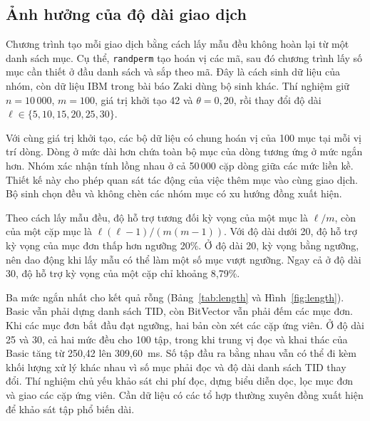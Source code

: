 \subsection{Ảnh hưởng của độ dài giao dịch}
Chương trình tạo mỗi giao dịch bằng cách lấy mẫu đều không hoàn
lại từ một danh sách mục. Cụ thể, \texttt{randperm} tạo hoán vị
các mã, sau đó chương trình lấy số mục cần thiết ở đầu danh sách
và sắp theo mã. Đây là cách sinh dữ liệu của nhóm, còn dữ liệu IBM
trong bài báo Zaki dùng bộ sinh khác. Thí nghiệm giữ $n=10\,000$,
$m=100$, giá trị khởi tạo 42 và $\theta=0{,}20$, rồi thay đổi độ dài
$\ell\in\{5,10,15,20,25,30\}$.

Với cùng giá trị khởi tạo, các bộ dữ liệu có chung hoán vị của
100 mục tại mỗi vị trí dòng. Dòng ở mức dài hơn chứa toàn bộ mục
của dòng tương ứng ở mức ngắn hơn. Nhóm xác nhận tính lồng nhau ở
cả 50\,000 cặp dòng giữa các mức liền kề. Thiết kế này cho phép
quan sát tác động của việc thêm mục vào cùng giao dịch. Bộ sinh
chọn đều và không chèn các nhóm mục có xu hướng đồng xuất hiện.

\begin{table}[tb]
\centering
\caption{Kết quả trên dữ liệu tổng hợp khi thay đổi độ dài giao dịch. Bảng dùng thời gian trung vị sau chạy khởi động và số tập phổ biến đầy đủ. Các tham số còn lại cố định theo Hình~\ref{fig:length}.}
\label{tab:length}
\setlength{\tabcolsep}{3pt}
\TableLength
\end{table}

Theo cách lấy mẫu đều, độ hỗ trợ tương đối kỳ vọng của một mục
là $\ell/m$, còn của một cặp mục là $\ell(\ell-1)/(m(m-1))$.
Với độ dài dưới 20, độ hỗ trợ kỳ vọng của mục đơn thấp hơn
ngưỡng 20\%. Ở độ dài 20, kỳ vọng bằng ngưỡng, nên dao động khi
lấy mẫu có thể làm một số mục vượt ngưỡng. Ngay cả ở độ dài 30,
độ hỗ trợ kỳ vọng của một cặp chỉ khoảng 8,79\%.

Ba mức ngắn nhất cho kết quả rỗng (Bảng~\ref{tab:length} và
Hình~\ref{fig:length}). Basic vẫn phải dựng danh sách TID, còn
BitVector vẫn phải đếm các mục đơn. Khi các mục đơn bắt đầu đạt
ngưỡng, hai bản còn xét các cặp ứng viên. Ở độ dài 25 và 30,
cả hai mức đều cho 100 tập, trong khi trung vị đọc và khai thác
của Basic tăng từ 250,42 lên 309,60~ms. Số tập đầu ra bằng nhau
vẫn có thể đi kèm khối lượng xử lý khác nhau vì số mục phải đọc
và độ dài danh sách TID thay đổi. Thí nghiệm chủ yếu khảo sát
chi phí đọc, dựng biểu diễn dọc, lọc mục đơn và giao các cặp
ứng viên. Cần dữ liệu có các tổ hợp thường xuyên đồng xuất
hiện để khảo sát tập phổ biến dài.

